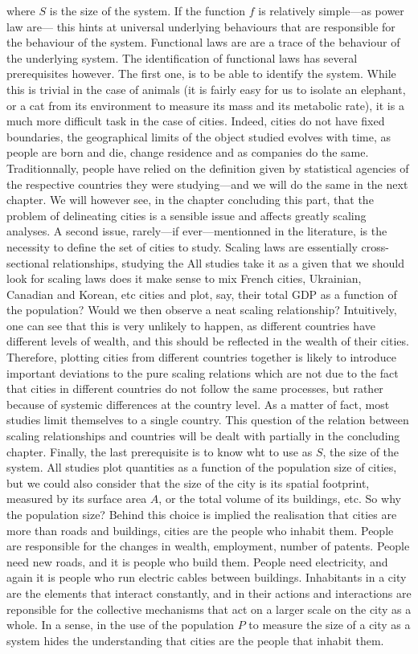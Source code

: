 where $S$ is the size of the system. If the function $f$ is relatively
simple---as power law are--- this hints at universal underlying behaviours that
are responsible for the behaviour of the system. Functional laws are are a trace
of the behaviour of the underlying system. The identification of functional laws
has several prerequisites however. The first one, is to be able to identify the
system. While this is trivial in the case of animals (it is fairly easy for us
to isolate an elephant, or a cat from its environment to measure its mass and
its metabolic rate), it is a much more difficult task in the case of cities.
Indeed, cities do not have fixed boundaries, the geographical limits of the
object studied evolves with time, as people are born and die, change residence
and as companies do the same. Traditionnally, people have relied on the
definition given by statistical agencies of the respective countries they were
studying---and we will do the same in the next chapter. We will however see, in
the chapter concluding this part, that the problem of delineating cities is a
sensible issue and affects greatly scaling analyses. A second issue, rarely---if
ever---mentionned in the literature, is the necessity to define the set of
cities to study. Scaling laws are essentially cross-sectional relationships,
studying the All studies take it as a given that we should look for scaling laws
does it make sense to mix French cities, Ukrainian, Canadian and Korean, etc
cities and plot, say, their total GDP as a function of the population? Would we
then observe a neat scaling relationship? Intuitively, one can see that this is
very unlikely to happen, as different countries have different levels of wealth,
and this should be reflected in the wealth of their cities. Therefore, plotting
cities from different countries together is likely to introduce important
deviations to the pure scaling relations which are not due to the fact that
cities in different countries do not follow the same processes, but rather
because of systemic differences at the country level. As a matter of fact, most
studies limit themselves to a single country. This question of the relation
between scaling relationships and countries will be dealt with partially in the
concluding chapter.  Finally, the last prerequisite is to know wht to use as
$S$, the size of the system. All studies plot quantities as a function of the
population size of cities, but we could also consider that the size of the city
is its spatial footprint, measured by its surface area $A$, or the total volume
of its buildings, etc. So why the population size? Behind this choice is implied
the realisation that cities are more than roads and buildings, cities are the
people who inhabit them. People are responsible for the changes in wealth,
employment, number of patents. People need new roads, and it is people who build
them. People need electricity, and again it is people who run electric cables
between buildings. Inhabitants in a city are the elements that interact
constantly, and in their actions and interactions are reponsible for the
collective mechanisms that act on a larger scale on the city as a whole. In a
sense, in the use of the population $P$ to measure the size of a city as a
system hides the understanding that cities are the people that inhabit them.


